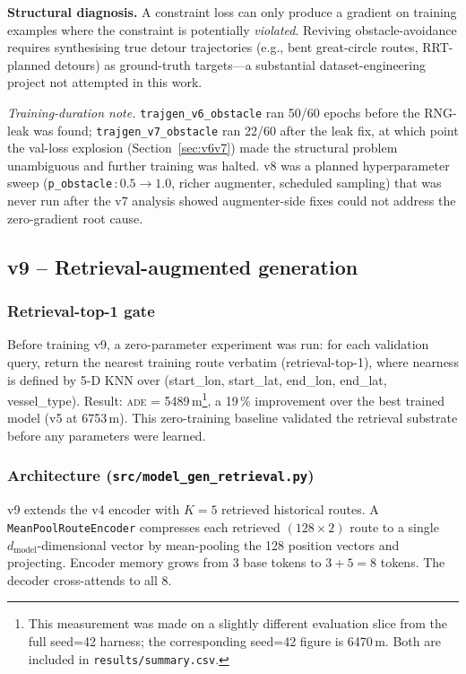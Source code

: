 \documentclass[11pt,a4paper]{article}
\newcommand{\ade}{\textsc{ade}}
\begin{document}
\textbf{Structural diagnosis.}
A constraint loss can only produce a gradient on training examples where the
constraint is potentially \emph{violated}.
Reviving obstacle-avoidance requires synthesising true detour trajectories
(e.g., bent great-circle routes, RRT-planned detours) as ground-truth targets---a
substantial dataset-engineering project not attempted in this work.

\noindent\textit{Training-duration note.}
\texttt{trajgen\_v6\_obstacle} ran 50/60 epochs before the RNG-leak was found;
\texttt{trajgen\_v7\_obstacle} ran 22/60 after the leak fix, at which point
the val-loss explosion (Section~\ref{sec:v6v7}) made the structural problem
unambiguous and further training was halted.
v8 was a planned hyperparameter sweep (\texttt{p\_obstacle}\,:\,$0.5\to1.0$,
richer augmenter, scheduled sampling) that was never run after the v7
analysis showed augmenter-side fixes could not address the
zero-gradient root cause.

\subsection{v9 -- Retrieval-augmented generation}
\label{sec:v9}

\subsubsection{Retrieval-top-1 gate}

Before training v9, a zero-parameter experiment was run:
for each validation query, return the nearest training route verbatim (retrieval-top-1),
where nearness is defined by 5-D KNN over
(start\_lon, start\_lat, end\_lon, end\_lat, vessel\_type).
Result: \ade{} = 5489\,m\footnote{This measurement was made on a slightly
different evaluation slice from the full seed=42 harness; the corresponding
seed=42 figure is 6470\,m.  Both are included in \texttt{results/summary.csv}.},
a 19\,\% improvement over the best trained model (v5 at 6753\,m).
This zero-training baseline validated the retrieval substrate before any parameters
were learned.

\subsubsection{Architecture (\texttt{src/model\_gen\_retrieval.py})}

v9 extends the v4 encoder with $K=5$ retrieved historical routes.
A \texttt{MeanPoolRouteEncoder} compresses each retrieved $(128\times2)$ route to a
single $d_\text{model}$-dimensional vector by mean-pooling the 128 position vectors
and projecting.
Encoder memory grows from 3 base tokens to $3 + 5 = 8$ tokens.
The decoder cross-attends to all 8.
\end{document}
